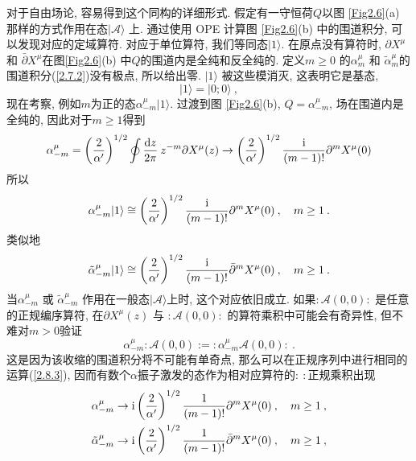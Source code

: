 对于自由场论, 容易得到这个同构的详细形式. 假定有一守恒荷$Q$以图 \ref{Fig2.6}(a) 那样的方式作用在态$\lvert\mathscr{A}\rangle$ 上. 通过使用 OPE 计算图 \ref{Fig2.6}(b) 中的围道积分, 可以发现对应的定域算符. 对应于单位算符, 我们等同态$|1\rangle$. 在原点没有算符时, $\partial X^{\mu}$ 和 $\bar{\partial} X^{\mu}$在图\ref{Fig2.6}(b) 中$Q$的围道内是全纯和反全纯的. 定义$m \geq 0$ 的$\alpha_{m}^{\mu}$ 和 $\tilde{\alpha}_{m}^{\mu}$的围道积分(\ref{2.7.2})没有极点, 所以给出零. $\lvert 1\rangle$ 被这些模消灭, 这表明它是基态,
\begin{equation}
\lvert 1\rangle=\lvert 0 ; 0\rangle \:, \label{2.8.2}
\end{equation}
现在考察, 例如$m$为正的态$\alpha_{-m}^{\mu}|1\rangle$. 过渡到图 \ref{Fig2.6}(b), $Q=\alpha_{-m}^{\mu}$, 场在围道内是全纯的, 因此对于$m\geq 1$得到
\begin{equation}\label{2.8.3}
\alpha_{-m}^{\mu}=\left(\frac{2}{\alpha^{\prime}}\right)^{1 / 2} \oint \frac{\mathrm{d} z}{2 \pi} \: z^{-m} \partial X^{\mu}(z) \rightarrow\left(\frac{2}{\alpha^{\prime}}\right)^{1 / 2} \frac{\mathrm{i}}{(m-1) !} \partial^{m} X^{\mu}(0)
\end{equation}
所以
\begin{equation}
\alpha_{-m}^{\mu}\lvert 1\rangle \cong\left(\frac{2}{\alpha^{\prime}}\right)^{1 / 2} \frac{\mathrm{i}}{(m-1) !} \partial^{m} X^{\mu}(0)\:, \quad m \geq 1 \:. \label{2.8.4}
\end{equation}
类似地
\begin{equation}
\tilde{\alpha}_{-m}^{\mu}|1\rangle \cong\left(\frac{2}{\alpha^{\prime}}\right)^{1 / 2} \frac{\mathrm{i}}{(m-1) !} \bar{\partial}^{m} X^{\mu}(0)\:, \quad m \geq 1 \:. \label{2.8.5}
\end{equation}
当$\alpha_{-m}^{\mu}$ 或 $\tilde{\alpha}_{-m}^{\mu}$ 作用在一般态$|\mathscr{A}\rangle$上时, 这个对应依旧成立. 如果$:\mathrel{ \mathscr{A}(0,0)}:$ 是任意的正规编序算符, 在$\partial X^{\mu}(z)$ 与 $:\mathrel{ \mathscr{A}(0,0)}:$ 的算符乘积中可能会有奇异性, 
但不难对$m>0$验证
\begin{equation}
\alpha_{-m}^{\mu} :\mathrel{\mathscr{A}(0,0)}:=:\mathrel{ \alpha_{-m}^{\mu} \mathscr{A}(0,0)}:  \:. \label{2.8.6}
\end{equation}
这是因为该收缩的围道积分将不可能有单奇点, 那么可以在正规序列中进行相同的运算(\ref{2.8.3}), 因而有数个$\alpha$振子激发的态作为相对应算符的$\mathrel{:\::}$正规乘积出现
\begin{subequations}\label{2.8.7}
\begin{align}
\alpha_{-m}^{\mu} &\rightarrow \mathrm{i}\left(\frac{2}{\alpha^{\prime}}\right)^{1 / 2} \frac{1}{(m-1) !} \partial^{m} X^{\mu}(0)\:, \quad m \geq 1 \:,  \\
\tilde{\alpha}_{-m}^{\mu} &\rightarrow \mathrm{i}\left(\frac{2}{\alpha^{\prime}}\right)^{1 / 2} \frac{1}{(m-1) !} \bar{\partial}^{m} X^{\mu}(0)\:, \quad m \geq 1 \:,
\end{align}
\end{subequations}
